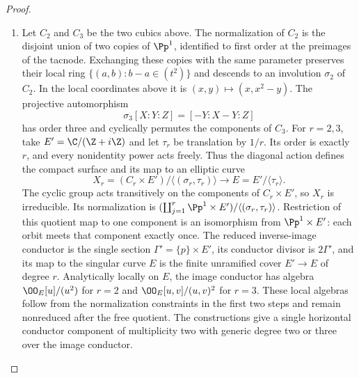 \begin{proof}
\begin{enumerate}[leftmargin=*]
\item Let $C_2$ and $C_3$ be the two cubics above. The normalization
of $C_2$ is the disjoint union of two copies of $\Pp^1$, identified
to first order at the preimages of the tacnode. Exchanging these
copies with the same parameter preserves their local ring
$\{(a,b):b-a\in(t^2)\}$ and descends to an involution $\sigma_2$
of $C_2$. In the local coordinates above it is
$(x,y)\mapsto(x,x^2-y)$. The projective automorphism
\[
 \sigma_3[X:Y:Z]=[-Y:X-Y:Z]
\]
has order three and cyclically permutes the components of $C_3$.
For $r=2,3$, take $E'=\C/(\Z+i\Z)$ and let $\tau_r$ be
translation by $1/r$. Its order is exactly $r$, and every nonidentity
power acts freely. Thus the diagonal action defines the compact
surface and its map to an elliptic curve
\[
 X_r=(C_r\times E')/\langle(\sigma_r,\tau_r)\rangle
       \longrightarrow E=E'/\langle\tau_r\rangle.
\]
The cyclic group acts transitively on the components of
$C_r\times E'$, so $X_r$ is irreducible. Its normalization is
$(\coprod_{j=1}^r\Pp^1\times E')/\langle(\sigma_r,\tau_r)\rangle$.
Restriction of this quotient map to one component is an isomorphism
from $\Pp^1\times E'$: each orbit meets that component exactly once.
The reduced inverse-image conductor is the single section
$\Gamma'=\{p\}\times E'$, its conductor divisor is $2\Gamma'$, and
its map to the singular curve $E$ is the finite unramified cover
$E'\to E$ of degree $r$. Analytically locally on $E$, the image
conductor has algebra $\OO_E[u]/(u^2)$ for $r=2$ and
$\OO_E[u,v]/(u,v)^2$ for $r=3$. These local algebras follow from
the normalization constraints in the first two steps and remain
nonreduced after the free quotient. The constructions give a single
horizontal conductor component of multiplicity two with generic
degree two or three over the image conductor.

\end{enumerate}
\end{proof}